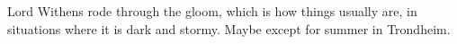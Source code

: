 \documentclass{novelette}
\begin{document}
\begin{opening}
\null\null\null\null\null\null
{}
\null\null\null\null\null
\end{opening}
 Lord Withens rode through the gloom,
which is how things usually are, in situations where it is dark and stormy.
Maybe except for summer in Trondheim.

\darkandstormy
\end{document}
